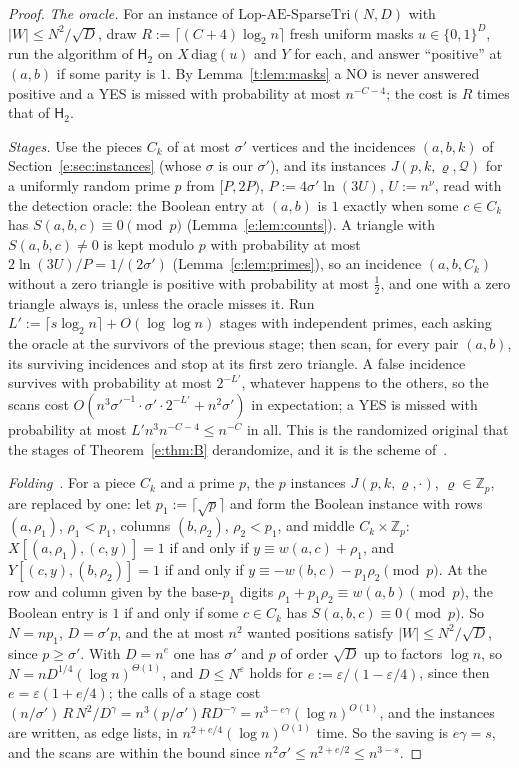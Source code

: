 \documentclass[11pt]{article}
\theoremstyle{definition}
\theoremstyle{remark}
\newcommand{\Z}{\mathbb{Z}}
\newcommand{\Lop}{\mathrm{Lop}\text{-}\allowbreak\mathrm{AE}\text{-}\allowbreak\mathrm{SparseTri}}
\newcommand{\Hyp}{\mathsf{H}}
\begin{document}
\begin{proof}
\emph{The oracle.} For an instance of $\Lop(N,D)$ with $|W|\le N^2/\sqrt D$, draw $R:=\lceil(C+4)\log_2n\rceil$ fresh uniform masks $u\in\{0,1\}^D$, run the algorithm of $\Hyp_2$ on $X\,\mathrm{diag}(u)$ and $Y$ for each, and answer ``positive'' at $(a,b)$ if some parity is $1$. By Lemma~\ref{t:lem:masks} a NO is never answered positive and a YES is missed with probability at most $n^{-C-4}$; the cost is $R$ times that of $\Hyp_2$.

\emph{Stages.} Use the pieces $C_k$ of at most $\sigma'$ vertices and the incidences $(a,b,k)$ of Section~\ref{e:sec:instances} (whose $\sigma$ is our $\sigma'$), and its instances $J(p,k,\varrho,\mathcal Q)$ for a uniformly random prime $p$ from $[P,2P)$, $P:=4\sigma'\ln(3U)$, $U:=n^\nu$, read with the detection oracle: the Boolean entry at $(a,b)$ is $1$ exactly when some $c\in C_k$ has $S(a,b,c)\equiv0\pmod p$ (Lemma~\ref{e:lem:counts}). A triangle with $S(a,b,c)\ne0$ is kept modulo $p$ with probability at most $2\ln(3U)/P=1/(2\sigma')$ (Lemma~\ref{c:lem:primes}), so an incidence $(a,b,C_k)$ without a zero triangle is positive with probability at most $\frac12$, and one with a zero triangle always is, unless the oracle misses it. Run $L':=\lceil s\log_2n\rceil+O(\log\log n)$ stages with independent primes, each asking the oracle at the survivors of the previous stage; then scan, for every pair $(a,b)$, its surviving incidences and stop at its first zero triangle. A false incidence survives with probability at most $2^{-L'}$, whatever happens to the others, so the scans cost $O(n^3\sigma'^{-1}\cdot\sigma'\cdot2^{-L'}+n^2\sigma')$ in expectation; a YES is missed with probability at most $L'n^3n^{-C-4}\le n^{-C}$ in all. This is the randomized original that the stages of Theorem~\ref{e:thm:B} derandomize, and it is the scheme of~\cite[Theorem~9]{Shr26}.

\emph{Folding}~\cite[Lemma~8]{Shr26}. For a piece $C_k$ and a prime $p$, the $p$ instances $J(p,k,\varrho,\cdot)$, $\varrho\in\Z_p$, are replaced by one: let $p_1:=\lceil\sqrt p\rceil$ and form the Boolean instance with rows $(a,\rho_1)$, $\rho_1<p_1$, columns $(b,\rho_2)$, $\rho_2<p_1$, and middle $C_k\times\Z_p$: $X[(a,\rho_1),(c,y)]=1$ if and only if $y\equiv w(a,c)+\rho_1$, and $Y[(c,y),(b,\rho_2)]=1$ if and only if $y\equiv-w(b,c)-p_1\rho_2\pmod p$. At the row and column given by the base-$p_1$ digits $\rho_1+p_1\rho_2\equiv w(a,b)\pmod p$, the Boolean entry is $1$ if and only if some $c\in C_k$ has $S(a,b,c)\equiv0\pmod p$. So $N=np_1$, $D=\sigma'p$, and the at most $n^2$ wanted positions satisfy $|W|\le N^2/\sqrt D$, since $p\ge\sigma'$. With $D=n^e$ one has $\sigma'$ and $p$ of order $\sqrt D$ up to factors $\log n$, so $N=nD^{1/4}(\log n)^{\Theta(1)}$, and $D\le N^\varepsilon$ holds for $e:=\varepsilon/(1-\varepsilon/4)$, since then $e=\varepsilon(1+e/4)$; the calls of a stage cost $(n/\sigma')\,R\,N^2/D^\gamma=n^3(p/\sigma')RD^{-\gamma}=n^{3-e\gamma}(\log n)^{O(1)}$, and the instances are written, as edge lists, in $n^{2+e/4}(\log n)^{O(1)}$ time. So the saving is $e\gamma=s$, and the scans are within the bound since $n^2\sigma'\le n^{2+e/2}\le n^{3-s}$.


\end{proof}
\end{document}
